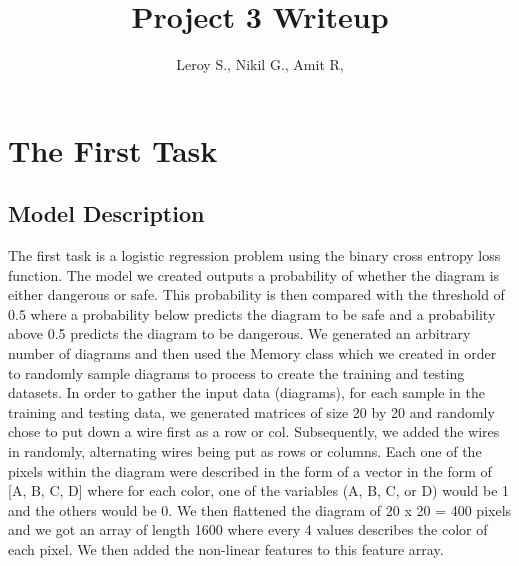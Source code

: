 \documentclass{article}
\title{Project 3 Writeup}
\author{Leroy S., Nikil G., Amit R,}
\begin{document}
\maketitle

\section*{The First Task}
\subsection*{Model Description}
The first task is a logistic regression problem using the binary cross entropy loss function. The model we created outputs a probability of whether the diagram is either dangerous or safe.
This probability is then compared with the threshold of 0.5 where a probability below predicts the diagram to be safe and a probability above 0.5 predicts the diagram to be dangerous. We generated an arbitrary number of diagrams and then used the Memory class which we created in order to randomly sample diagrams to process to create the training and testing datasets. 
In order to gather the input data (diagrams), for each sample in the training and testing data, we generated matrices of size 20 by 20 and randomly chose to put down a wire first as a row or col. Subsequently, we added the wires in randomly,
alternating wires being put as rows or columns. Each one of the pixels within the diagram were described in the form of a vector in the form of [A, B, C, D] where for each color, one of the variables (A, B, C, or D)
would be 1 and the others would be 0. We then flattened the diagram of 20 x 20 = 400 pixels and we got an array of length 1600 where every 4 values describes the color of each pixel. We then added the non-linear features to this feature array. \newline
\end{document}
